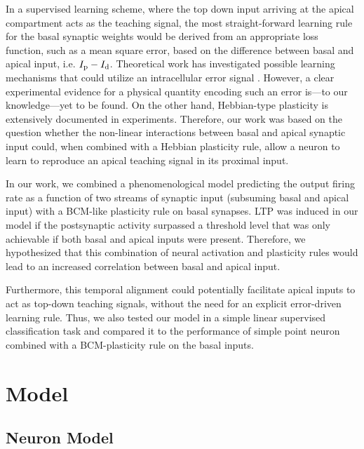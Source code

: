 \documentclass[10pt,a4paper,twocolumn]{article}
\begin{document}
		In a supervised learning scheme, where the top down input
		arriving at the apical compartment acts as the teaching signal,
		the most straight-forward learning rule for the basal synaptic
		weights would be derived from an appropriate loss function,
		such as a mean square error, based on the difference between 
		basal and apical input, i.e. $I_{\rm p} - I_{\rm d}$. Theoretical work has 
		investigated possible learning mechanisms
		that could utilize an intracellular error signal
		\citep{Urbanczik_2014,Schiess_2016,Guerguiev_2017}.
		However, a clear experimental
		evidence for a physical quantity encoding such an error 
		is---to our knowledge---yet to be found. 
		On the other hand, Hebbian-type plasticity is extensively
		documented in experiments. Therefore, our work was
		based on the question whether the non-linear interactions
		between basal and apical synaptic input could, when
		combined with a Hebbian plasticity rule, allow a neuron
		to learn to reproduce an apical teaching signal in its
		proximal input.
		
		In our work, we combined a phenomenological model predicting the output
		firing rate as a function of two streams of synaptic input (subsuming basal and apical input)
		with a BCM-like plasticity rule on basal synapses. LTP was induced in our model 
		if the postsynaptic activity surpassed a threshold level that was only achievable if 
		both basal and apical inputs were present. Therefore, we hypothesized that 
		this combination of neural activation and plasticity rules would lead to an
		increased correlation between basal and apical input.
		
		Furthermore, this temporal alignment could potentially facilitate apical inputs to act
		as top-down teaching signals, without the need for an explicit error-driven
		learning rule. Thus, we also tested our model in a simple linear 
		supervised classification task and compared it to the performance of simple
		point neuron combined with a BCM-plasticity rule on the basal inputs.
		
		\section{Model}
		
		\subsection{Neuron Model}
		
\end{document}
